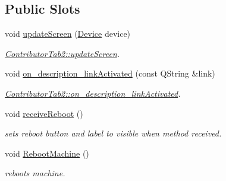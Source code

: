 \subsection*{Public Slots}
\begin{DoxyCompactItemize}
\item 
void \hyperlink{classContributorTab2_abf252c3c3cacdc4a4d1f369ffd4fbb99}{update\+Screen} (\hyperlink{classDevice}{Device} device)
\begin{DoxyCompactList}\small\item\em \hyperlink{classContributorTab2_abf252c3c3cacdc4a4d1f369ffd4fbb99}{Contributor\+Tab2\+::update\+Screen}. \end{DoxyCompactList}\item 
void \hyperlink{classContributorTab2_a22fb06bbd151a407ff40404897cabb4d}{on\+\_\+description\+\_\+link\+Activated} (const Q\+String \&link)
\begin{DoxyCompactList}\small\item\em \hyperlink{classContributorTab2_a22fb06bbd151a407ff40404897cabb4d}{Contributor\+Tab2\+::on\+\_\+description\+\_\+link\+Activated}. \end{DoxyCompactList}\item 
\mbox{\label{classContributorTab2_ab8a868f09884b9b5ce0e4aa7c6940166}} 
void \hyperlink{classContributorTab2_ab8a868f09884b9b5ce0e4aa7c6940166}{receive\+Reboot} ()
\begin{DoxyCompactList}\small\item\em sets reboot button and label to visible when method received. \end{DoxyCompactList}\item 
\mbox{\label{classContributorTab2_a3b818b61d87562521615de0b57f29a58}} 
void \hyperlink{classContributorTab2_a3b818b61d87562521615de0b57f29a58}{Reboot\+Machine} ()
\begin{DoxyCompactList}\small\item\em reboots machine. \end{DoxyCompactList}\end{DoxyCompactItemize}
